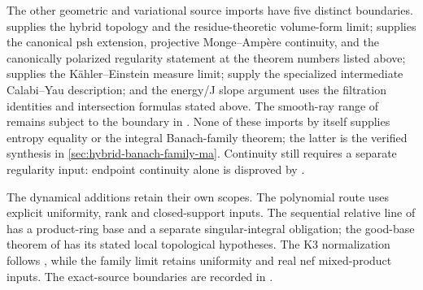 The other geometric and variational source imports have five distinct boundaries.
\cite{BJ17Hybrid} supplies the hybrid topology and the residue-theoretic
volume-form limit; \cite{PS23Hybrid} supplies the canonical psh extension,
projective Monge--Amp\`ere continuity, and the canonically polarized
regularity statement at the theorem numbers listed above;
\cite{PS22HybridKE} supplies the K\"ahler--Einstein measure limit;
\cite{Li25Intermediate,LT26Intermediate} supply the specialized
intermediate Calabi--Yau description; and the energy/J slope argument uses
the filtration identities and intersection formulas stated above. The smooth-ray range of
\cite{BHJ19} remains subject to the boundary in \cite{BHJ19err}.  None of these imports by
itself supplies entropy equality or the integral Banach-family theorem;
the latter is the verified synthesis in
\cref{sec:hybrid-banach-family-ma}.  Continuity still requires a separate regularity input: endpoint
continuity alone is disproved by
.

The dynamical additions retain their own scopes. The polynomial route
uses explicit uniformity, rank and closed-support inputs. The sequential
relative line of \cite{FavreGong26SequentialV4} has a product-ring base
and a separate singular-integral obligation; the good-base theorem of
\cite{Poi25DynamicsZV5} has its stated local topological hypotheses.
The K3 normalization follows \cite{Cantat01K3Published,Filip19K3V1},
while the family limit retains uniformity and real nef mixed-product
inputs. The exact-source boundaries are recorded in
.
